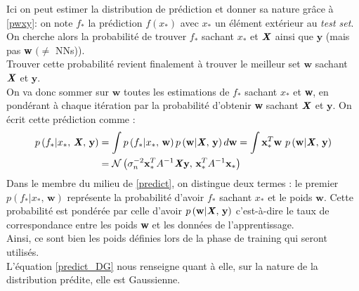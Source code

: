 \documentclass[a4paper,12pt]{report}
\newcommand{\bepar}[1]{
	\left( #1 \right)  
}
\newcommand{\cad}{c'est-à-dire}
\numberwithin{equation}{section} %
\begin{document}
\noindent Ici on peut estimer la distribution de prédiction et donner sa nature grâce à \eqref{pwxy}: on note $f_*$ la prédiction $f(x_*)$ avec $x_*$ un élément extérieur au \textit{test set}. \\ On cherche alors la probabilité de trouver $f_*$ sachant $x_*$ et $\textbf{\textit{X}}$ ainsi que $\textbf{y}$ (mais pas \textbf{w} $(\neq$ NNs)). \\
Trouver cette probabilité revient finalement à trouver le meilleur set $\textbf{w}$ sachant $\textbf{\textit{X}}$ et $\textbf{y}$.\\
On va donc sommer sur $\textbf{w}$ toutes les estimations de $f_*$ sachant $x_*$ et \textbf{w}, en pondérant à chaque itération par la probabilité d'obtenir \textbf{w} sachant $\textbf{\textit{X}}$ et $\textbf{y}$. On écrit cette prédiction comme :
\begin{align}
p\bepar{f_*|x_*, \, \textbf{\textit{X}}, \, \textbf{y}} &= \int p\bepar{f_*|x_*,\, \textbf{w}} p\bepar{\textbf{w}|\textbf{\textit{X}}, \, \textbf{y}} d\textbf{w} = \int \textbf{x}_*^T\textbf{w} ~ p\bepar{\textbf{w} | \textbf{\textit{X}}, \, \textbf{y}} \label{predict}\\
&= \mathcal{N}\bepar{\sigma_n^{-2}\textbf{x}_*^TA^{-1}\textbf{\textit{X}}\textbf{y}, \, \textbf{x}_*^T A^{-1} \textbf{x}_*} \label{predict_DG}
\end{align}
Dans le membre du milieu de \eqref{predict}, on distingue deux termes : le premier $p\bepar{f_*|x_*,\, \textbf{w}}$ représente la probabilité d'avoir $f_*$ sachant $x_*$ et le poids $\textbf{w}$. Cette probabilité est pondérée par celle d'avoir $p\bepar{\textbf{w}|\textbf{\textit{X}}, \, \textbf{y}}$ \cad $ $ le taux de correspondance entre les poids \textbf{w} et les données de l'apprentissage.\\
Ainsi, ce sont bien les poids définies lors de la phase de training qui seront utilisés.\\
L'équation \eqref{predict_DG} nous renseigne quant à elle, sur la nature de la distribution prédite, elle est Gaussienne.
\end{document}
